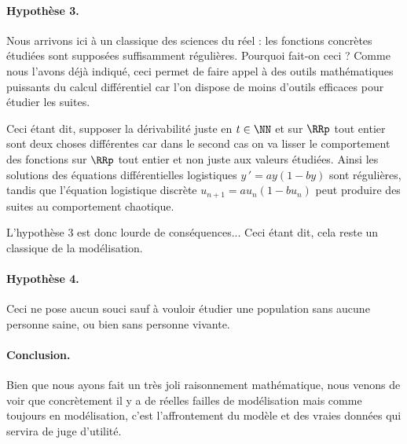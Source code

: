 

\paragraph{Hypothèse 3.} Nous arrivons ici à un classique des sciences du réel : les fonctions concrètes étudiées sont supposées suffisamment régulières. Pourquoi fait-on ceci ? Comme nous l'avons déjà indiqué, ceci permet de faire appel à des outils mathématiques puissants du calcul différentiel car l'on dispose de moins d'outils efficaces pour étudier les suites. 

\smallskip

Ceci étant dit, supposer la dérivabilité juste en $t \in \NN$ et sur $\RRp$ tout entier sont deux choses différentes car dans le second cas on va lisser le comportement des fonctions sur $\RRp$ tout entier et non juste aux valeurs étudiées.
Ainsi les solutions des équations différentielles logistiques $y\,' = a y (1 - b y)$ sont régulières, tandis que l'équation logistique discrète $u_{n+1} = a u_n (1 - b u_n)$ peut produire des suites au comportement chaotique. 

\smallskip

L'hypothèse 3 est donc lourde de conséquences... Ceci étant dit, cela reste un classique de la modélisation.




\paragraph{Hypothèse 4.} Ceci ne pose aucun souci sauf à vouloir étudier une population sans aucune personne saine, ou bien sans personne vivante.




\paragraph{Conclusion.} Bien que nous ayons fait un très joli raisonnement mathématique, nous venons de voir que concrètement il y a de réelles failles de modélisation mais comme toujours en modélisation, c'est l'affrontement du modèle et des vraies données qui servira de juge d'utilité.
